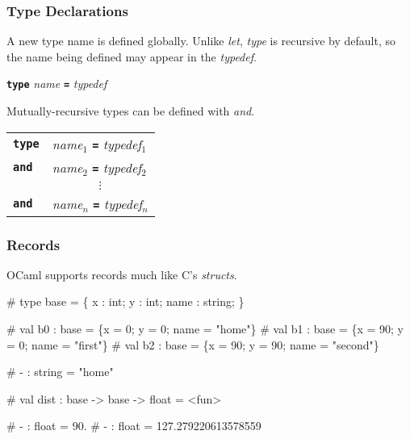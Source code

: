 \documentclass{plt}
\begin{document}
\begin{frame}[fragile]
  \frametitle{Type Declarations}

A new type name is defined globally.  Unlike \emph{let}, \emph{type}
is recursive by default, so the name being defined may appear in the
\emph{typedef}.

  \begin{center}
    \textbf{\texttt{type}} \emph{name} \textbf{\texttt{=}} \emph{typedef}
  \end{center}

Mutually-recursive types can be defined with \emph{and}.

\begin{center}
\begin{tabular}{l@{\;}l}
\textbf{\texttt{type}} & \emph{name}$_1$ \textbf{\texttt{=}}
\emph{typedef}$_1$ \\
\textbf{\texttt{and}} & \emph{name}$_2$ \textbf{\texttt{=}}
\emph{typedef}$_2$ \\
& \multicolumn{1}{c}{$\vdots$} \\
\textbf{\texttt{and}} & \emph{name}$_n$ \textbf{\texttt{=}}
\emph{typedef}$_n$ \\
\end{tabular}
\end{center}

\end{frame}

\begin{frame}[fragile]
  \frametitle{Records}

OCaml supports records much like C's \emph{structs}.

\begin{interactive}
# 
type base = \{ x : int; y : int; name : string; \}

# 
val b0 : base = \{x = 0; y = 0; name = "home"\}
# 
val b1 : base = \{x = 90; y = 0; name = "first"\}
# 
val b2 : base = \{x = 90; y = 90; name = "second"\}

# 
- : string = "home"

# 
val dist : base -> base -> float = <fun>

# 
- : float = 90.
# 
- : float = 127.279220613578559
\end{interactive}

\end{frame}
\end{document}
